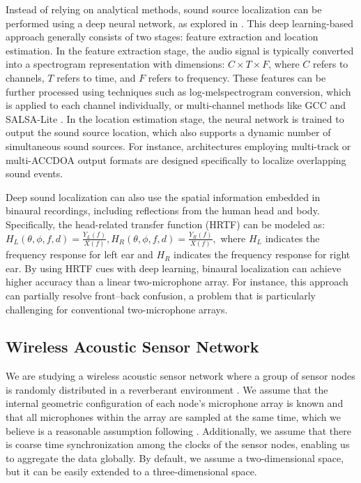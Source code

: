 Instead of relying on analytical methods, sound source localization can be performed using a deep neural network, as explored in \cite{wang2022nerc}. This deep learning-based approach generally consists of two stages: feature extraction and location estimation.
In the feature extraction stage, the audio signal is typically converted into a spectrogram representation with dimensions: \(C\times T \times F\), where \(C\) refers to channels, \(T\) refers to time, and \(F\) refers to frequency. These features can be further processed using techniques such as log-melspectrogram conversion, which is applied to each channel individually, or multi-channel methods like GCC \cite{knapp1976generalized} and SALSA-Lite \cite{nguyen2022salsa}.
In the location estimation stage, the neural network is trained to output the sound source location, which also supports a dynamic number of simultaneous sound sources. For instance, architectures employing multi-track \cite{cao2021improved} or multi-ACCDOA \cite{shimada2022multi} output formats are designed specifically to localize overlapping sound events.

Deep sound localization can also use the spatial information embedded in binaural recordings, including reflections from the human head and body. Specifically, the head-related transfer function (HRTF) can be modeled as:
\(H_{L}(\theta, \phi, f, d) = \frac{Y_{L}(f)}{X(f)}, H_{R}(\theta, \phi, f, d) = \frac{Y_{R}(f)}{X(f)},\) where $H_{L}$ indicates the frequency response for left ear and $H_{R}$ indicates the frequency response for right ear. 
By using HRTF cues with deep learning, binaural localization can achieve higher accuracy than a linear two-microphone array. For instance, this approach can partially resolve front--back confusion, a problem that is particularly challenging for conventional two-microphone arrays.


\subsection{Wireless Acoustic Sensor Network}
We are studying a wireless acoustic sensor network where a group of sensor nodes is randomly distributed in a reverberant environment \cite{bertrand2011applications}. We assume that the internal geometric configuration of each node's microphone array is known and that all microphones within the array are sampled at the same time, which we believe is a reasonable assumption following \cite{gburrek2021geometry}. Additionally, we assume that there is coarse time synchronization among the clocks of the sensor nodes, enabling us to aggregate the data globally. By default, we assume a two-dimensional space, but it can be easily extended to a three-dimensional space.

